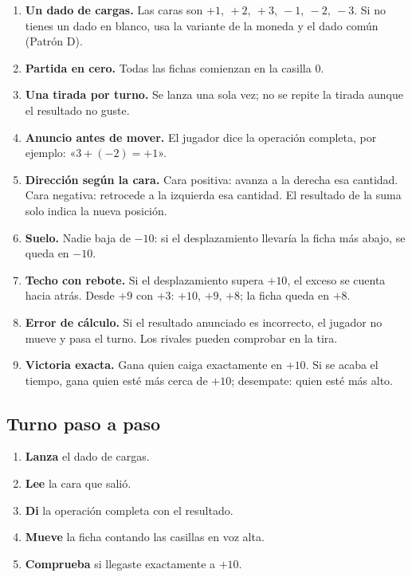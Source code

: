 \documentclass[12pt, letterpaper]{article}
\begin{document}
\begin{enumerate}[leftmargin=*]
  \item \textbf{Un dado de cargas.} Las caras son $+1,\ +2,\ +3,\ -1,\ -2,\ -3$. Si no tienes un dado en blanco, usa la variante de la moneda y el dado común (Patrón D).
  \item \textbf{Partida en cero.} Todas las fichas comienzan en la casilla $0$.
  \item \textbf{Una tirada por turno.} Se lanza una sola vez; no se repite la tirada aunque el resultado no guste.
  \item \textbf{Anuncio antes de mover.} El jugador dice la operación completa, por ejemplo: «$3+(-2)=+1$».
  \item \textbf{Dirección según la cara.} Cara positiva: avanza a la derecha esa cantidad. Cara negativa: retrocede a la izquierda esa cantidad. El resultado de la suma solo indica la nueva posición.
  \item \textbf{Suelo.} Nadie baja de $-10$: si el desplazamiento llevaría la ficha más abajo, se queda en $-10$.
  \item \textbf{Techo con rebote.} Si el desplazamiento supera $+10$, el exceso se cuenta hacia atrás. Desde $+9$ con $+3$: $+10$, $+9$, $+8$; la ficha queda en $+8$.
  \item \textbf{Error de cálculo.} Si el resultado anunciado es incorrecto, el jugador no mueve y pasa el turno. Los rivales pueden comprobar en la tira.
  \item \textbf{Victoria exacta.} Gana quien caiga exactamente en $+10$. Si se acaba el tiempo, gana quien esté más cerca de $+10$; desempate: quien esté más alto.
\end{enumerate}

\subsection{Turno paso a paso}

\begin{enumerate}[leftmargin=*]
  \item \textbf{Lanza} el dado de cargas.
  \item \textbf{Lee} la cara que salió.
  \item \textbf{Di} la operación completa con el resultado.
  \item \textbf{Mueve} la ficha contando las casillas en voz alta.
  \item \textbf{Comprueba} si llegaste exactamente a $+10$.
\end{enumerate}
\end{document}
